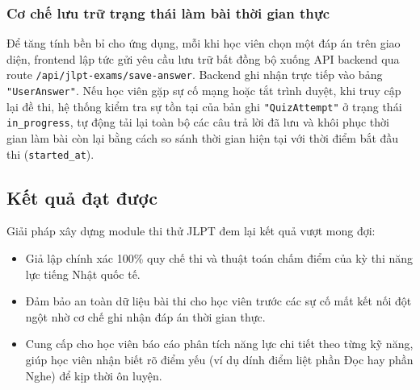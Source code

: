 \documentclass[../DoAn.tex]{subfiles}
\begin{document}
\subsubsection{Cơ chế lưu trữ trạng thái làm bài thời gian thực}
Để tăng tính bền bỉ cho ứng dụng, mỗi khi học viên chọn một đáp án trên giao diện, frontend lập tức gửi yêu cầu lưu trữ bất đồng bộ xuống API backend qua route \texttt{/api/jlpt-exams/save-answer}. Backend ghi nhận trực tiếp vào bảng \texttt{"UserAnswer"}. Nếu học viên gặp sự cố mạng hoặc tắt trình duyệt, khi truy cập lại đề thi, hệ thống kiểm tra sự tồn tại của bản ghi \texttt{"QuizAttempt"} ở trạng thái \texttt{in\_progress}, tự động tải lại toàn bộ các câu trả lời đã lưu và khôi phục thời gian làm bài còn lại bằng cách so sánh thời gian hiện tại với thời điểm bắt đầu thi (\texttt{started\_at}).

\subsection{Kết quả đạt được}
Giải pháp xây dựng module thi thử JLPT đem lại kết quả vượt mong đợi:
\begin{itemize}
    \item Giả lập chính xác 100\% quy chế thi và thuật toán chấm điểm của kỳ thi năng lực tiếng Nhật quốc tế.
    \item Đảm bảo an toàn dữ liệu bài thi cho học viên trước các sự cố mất kết nối đột ngột nhờ cơ chế ghi nhận đáp án thời gian thực.
    \item Cung cấp cho học viên báo cáo phân tích năng lực chi tiết theo từng kỹ năng, giúp học viên nhận biết rõ điểm yếu (ví dụ dính điểm liệt phần Đọc hay phần Nghe) để kịp thời ôn luyện.
\end{itemize}
\end{document}
